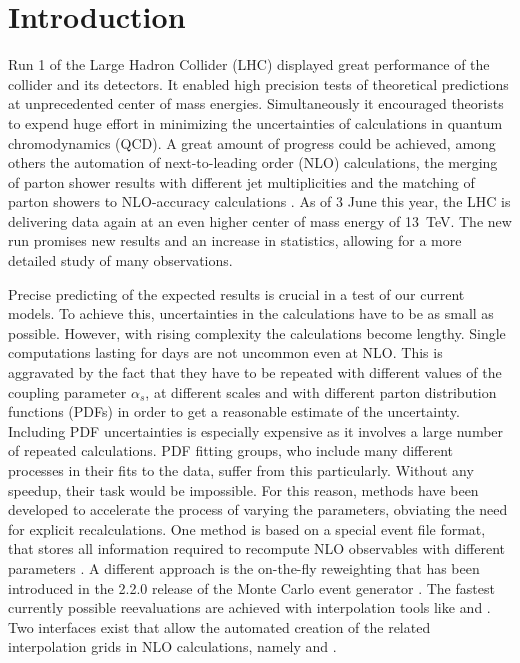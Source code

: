 
\chapter{Introduction}
Run 1 of the Large Hadron Collider (LHC) displayed great performance of the collider and its detectors.
It enabled high precision tests of theoretical predictions at unprecedented center of mass energies.
Simultaneously it encouraged theorists to expend huge effort in minimizing the uncertainties of calculations in quantum chromodynamics (QCD).
A great amount of progress could be achieved, among others the automation of next-to-leading order (NLO) calculations, the merging of parton shower results with different jet multiplicities and the matching of parton showers to NLO-accuracy calculations \cite{eventgenerators}.
As of 3 June this year, the LHC is delivering data again at an even higher center of mass energy of \SI{13}{\tera\electronvolt}.
The new run promises new results and an increase in statistics, allowing for a more detailed study of many observations.

Precise predicting of the expected results is crucial in a test of our current models.
To achieve this, uncertainties in the calculations have to be as small as possible.
However, with rising complexity the calculations become lengthy.
Single computations lasting for days are not uncommon even at NLO.
This is aggravated by the fact that they have to be repeated with different values of the coupling parameter $\alpha_s$, at different scales and with different parton distribution functions (PDFs) in order to get a reasonable estimate of the uncertainty.
Including PDF uncertainties is especially expensive as it involves a large number of repeated calculations.
PDF fitting groups, who include many different processes in their fits to the data, suffer from this particularly.
Without any speedup, their task would be impossible.
For this reason, methods have been developed to accelerate the process of varying the parameters, obviating the need for explicit recalculations.
One method is based on a special event file format, that stores all information required to recompute NLO observables with different parameters \cite{ntuples}.
A different approach is the on-the-fly reweighting that has been introduced in the 2.2.0 release of the Monte Carlo event generator \sherpa{} \cite{mcgrid20}.
The fastest currently possible reevaluations are achieved with interpolation tools like \appl{} \cite{applgrid2010} and \fnlo{} \cite{fastnlo2006}.
Two interfaces exist that allow the automated creation of the related interpolation grids in NLO calculations, namely \amcfast{} \cite{amcfast} and \mcgrid{} \cite{mcgrid2013}.

